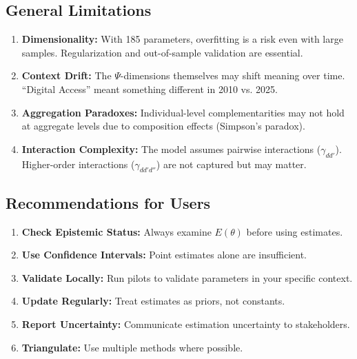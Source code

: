 \documentclass[11pt,a4paper]{article}
\theoremstyle{definition}
\begin{document}
\subsection{General Limitations}

\begin{enumerate}
    \item \textbf{Dimensionality:}
    With 185 parameters, overfitting is a risk even with large samples. 
    Regularization and out-of-sample validation are essential.
    
    \item \textbf{Context Drift:}
    The $\Psi$-dimensions themselves may shift meaning over time. 
    ``Digital Access'' meant something different in 2010 vs. 2025.
    
    \item \textbf{Aggregation Paradoxes:}
    Individual-level complementarities may not hold at aggregate levels 
    due to composition effects (Simpson's paradox).
    
    \item \textbf{Interaction Complexity:}
    The model assumes pairwise interactions ($\gamma_{dd'}$). Higher-order 
    interactions ($\gamma_{dd'd''}$) are not captured but may matter.
\end{enumerate}

\subsection{Recommendations for Users}

\begin{tcolorbox}[colback=yellow!5!white, colframe=yellow!75!black, title=Best Practices]
\begin{enumerate}
    \item \textbf{Check Epistemic Status:} Always examine $E(\theta)$ before using estimates.
    \item \textbf{Use Confidence Intervals:} Point estimates alone are insufficient.
    \item \textbf{Validate Locally:} Run pilots to validate parameters in your specific context.
    \item \textbf{Update Regularly:} Treat estimates as priors, not constants.
    \item \textbf{Report Uncertainty:} Communicate estimation uncertainty to stakeholders.
    \item \textbf{Triangulate:} Use multiple methods where possible.
\end{enumerate}
\end{tcolorbox}
\end{document}
